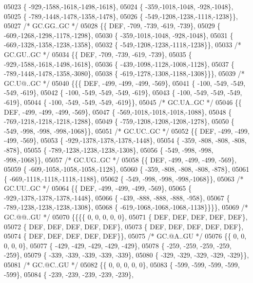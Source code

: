 \begin{DoxyCode}
05023 \{ -929,-1588,-1618,-1498,-1618\},
05024 \{ -359,-1018,-1048, -928,-1048\},
05025 \{ -789,-1448,-1478,-1358,-1478\},
05026 \{ -549,-1208,-1238,-1118,-1238\}\},
05027 \textcolor{comment}{/* GC.GG..GC */}
05028 \{\{  DEF, -709, -739, -619, -739\},
05029 \{ -609,-1268,-1298,-1178,-1298\},
05030 \{ -359,-1018,-1048, -928,-1048\},
05031 \{ -669,-1328,-1358,-1238,-1358\},
05032 \{ -549,-1208,-1238,-1118,-1238\}\},
05033 \textcolor{comment}{/* GC.GU..GC */}
05034 \{\{  DEF, -709, -739, -619, -739\},
05035 \{ -929,-1588,-1618,-1498,-1618\},
05036 \{ -439,-1098,-1128,-1008,-1128\},
05037 \{ -789,-1448,-1478,-1358,-3080\},
05038 \{ -619,-1278,-1308,-1188,-1308\}\}\},
05039 \textcolor{comment}{/* GC.U@..GC */}
05040 \{\{\{  DEF, -499, -499, -499, -569\},
05041 \{ -100, -549, -549, -549, -619\},
05042 \{ -100, -549, -549, -549, -619\},
05043 \{ -100, -549, -549, -549, -619\},
05044 \{ -100, -549, -549, -549, -619\}\},
05045 \textcolor{comment}{/* GC.UA..GC */}
05046 \{\{  DEF, -499, -499, -499, -569\},
05047 \{ -569,-1018,-1018,-1018,-1088\},
05048 \{ -769,-1218,-1218,-1218,-1288\},
05049 \{ -759,-1208,-1208,-1208,-1278\},
05050 \{ -549, -998, -998, -998,-1068\}\},
05051 \textcolor{comment}{/* GC.UC..GC */}
05052 \{\{  DEF, -499, -499, -499, -569\},
05053 \{ -929,-1378,-1378,-1378,-1448\},
05054 \{ -359, -808, -808, -808, -878\},
05055 \{ -789,-1238,-1238,-1238,-1308\},
05056 \{ -549, -998, -998, -998,-1068\}\},
05057 \textcolor{comment}{/* GC.UG..GC */}
05058 \{\{  DEF, -499, -499, -499, -569\},
05059 \{ -609,-1058,-1058,-1058,-1128\},
05060 \{ -359, -808, -808, -808, -878\},
05061 \{ -669,-1118,-1118,-1118,-1188\},
05062 \{ -549, -998, -998, -998,-1068\}\},
05063 \textcolor{comment}{/* GC.UU..GC */}
05064 \{\{  DEF, -499, -499, -499, -569\},
05065 \{ -929,-1378,-1378,-1378,-1448\},
05066 \{ -439, -888, -888, -888, -958\},
05067 \{ -789,-1238,-1238,-1238,-1308\},
05068 \{ -619,-1068,-1068,-1068,-1138\}\}\}\},
05069 \textcolor{comment}{/* GC.@@..GU */}
05070 \{\{\{\{    0,    0,    0,    0,    0\},
05071 \{  DEF,  DEF,  DEF,  DEF,  DEF\},
05072 \{  DEF,  DEF,  DEF,  DEF,  DEF\},
05073 \{  DEF,  DEF,  DEF,  DEF,  DEF\},
05074 \{  DEF,  DEF,  DEF,  DEF,  DEF\}\},
05075 \textcolor{comment}{/* GC.@A..GU */}
05076 \{\{    0,    0,    0,    0,    0\},
05077 \{ -429, -429, -429, -429, -429\},
05078 \{ -259, -259, -259, -259, -259\},
05079 \{ -339, -339, -339, -339, -339\},
05080 \{ -329, -329, -329, -329, -329\}\},
05081 \textcolor{comment}{/* GC.@C..GU */}
05082 \{\{    0,    0,    0,    0,    0\},
05083 \{ -599, -599, -599, -599, -599\},
05084 \{ -239, -239, -239, -239, -239\},

\end{DoxyCode}
